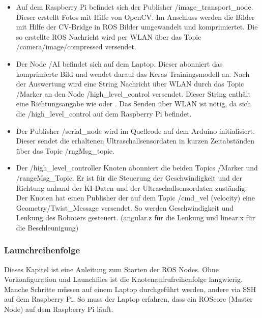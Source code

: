 \documentclass[conference]{IEEEtran}
\begin{document}
	\begin{itemize}
		\item Auf dem Raspberry Pi befindet sich der Publisher 
		/image\_transport\_node. Dieser erstellt Fotos mit Hilfe von OpenCV. Im 
		Anschluss werden die Bilder mit Hilfe der CV-Bridge in ROS Bilder 
		umgewandelt und komprimiertet. Die so erstellte ROS Nachricht wird 
		per WLAN über das Topic /camera/image/compressed versendet.
		
		\item Der Node /AI befindet sich auf dem Laptop. Dieser abonniert das 
		komprimierte Bild und wendet darauf das Keras Trainingsmodell an. 
		Nach der Auswertung wird eine String Nachricht über WLAN durch 
		das Topic /Marker an den Node /high\_level\_control versendet. 
		Dieser String enthält eine Richtungsangabe wie  oder 
		. Das Senden über WLAN ist nötig, da sich die  
		/high\_level\_control auf dem Raspberry Pi befindet.
		
		\item Der Publisher /serial\_node wird im Quellcode auf dem Arduino initialisiert. Dieser sendet die erhaltenen Ultraschallsensordaten in kurzen Zeitabständen über das Topic /rngMsg\_topic.
		
		\item Der /high\_level\_controller Knoten abonniert die beiden Topics 
		/Marker und /rangeMsg\_Topic. Er ist für die Steuerung der 
		Geschwindigkeit und der Richtung anhand der KI Daten und der 
		Ultraschallsensordaten zuständig. Der Knoten hat einen Publisher der 
		auf dem  Topic /cmd\_vel (velocity) eine Geometry/Twist\_Message 
		versendet. So werden Geschwindigkeit und Lenkung des Roboters 
		gesteuert. (angular.z für die Lenkung und linear.x für die 
		Beschleunigung)
		
		
	\end{itemize}

	\subsubsection{Launchreihenfolge}%
	
	Dieses Kapitel ist eine Anleitung zum Starten der ROS Nodes. Ohne 
	Vorkonfiguration und Launchfiles ist 
	die Knotenaufrufreihenfolge langwierig. Manche Schritte müssen auf einem 
	Laptop durchgeführt werden, andere via SSH auf dem Raspberry Pi. So 
	muss der Laptop erfahren, dass ein ROScore (Master Node) auf dem 
	Raspberry Pi läuft.	\\
	
\end{document}

